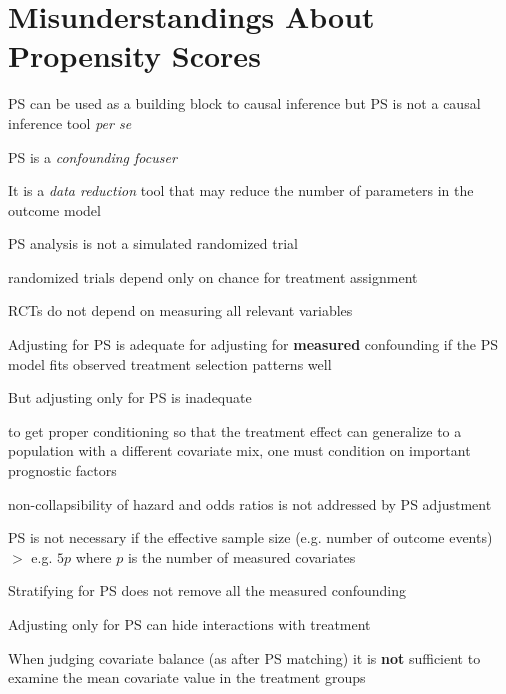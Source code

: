 \section{Misunderstandings About Propensity Scores}
\bi
\item PS can be used as a building block to causal inference but PS is not a
  causal inference tool \emph{per se}
\item PS is a \emph{confounding focuser}
\item It is a \emph{data reduction} tool that may reduce the number of
  parameters in the outcome model
\item PS analysis is not a simulated randomized trial
  \bi
  \item randomized trials depend only on chance for treatment
    assignment
  \item RCTs do not depend on measuring all relevant variables
  \ei
\item Adjusting for PS is adequate for adjusting for \textbf{measured}
  confounding if the PS model fits observed treatment selection
  patterns well
\item But adjusting only for PS is inadequate
  \bi
  \item to get proper conditioning so that the treatment effect can
    generalize to a population with a different covariate mix, one
    must condition on important prognostic factors
  \item non-collapsibility of hazard and odds ratios is not addressed
    by PS adjustment
  \ei
\item PS is not necessary if the effective sample size (e.g. number of
  outcome events) $>$ e.g. $5p$ where $p$ is the number of measured covariates
\item Stratifying for PS does not remove all the measured confounding
\item Adjusting only for PS can hide interactions with treatment
\item When judging covariate balance (as after PS matching) it is
  \textbf{not} sufficient to examine the mean covariate value in the
  treatment groups
\ei

